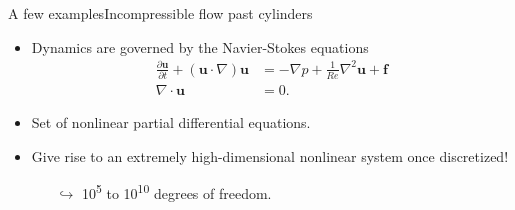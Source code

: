 \documentclass[usenames,dvipsnames,svgnames,10pt,aspectratio=169]{beamer}
\begin{document}
\begin{frame}[t, c]{A few examples}{Incompressible flow past cylinders}
	\begin{minipage}{.48\textwidth}
		\begin{itemize}
			\item Dynamics are governed by the Navier-Stokes equations
			\[
				\begin{aligned}
					\displaystyle \frac{\partial {\bm u}}{\partial t} + ({\bm u} \cdot \nabla ) {\bm u} & = - \nabla p + \frac{1}{Re}\nabla^2 {\bm u} + {\bm f}\\
					\nabla \cdot {\bm u} & = 0.
				\end{aligned}
			\]

			\medskip

			\item Set of nonlinear partial differential equations.

			\bigskip

			\item Give rise to an extremely high-dimensional nonlinear system once discretized!
			\begin{itemize}
				\item[\( \hookrightarrow \)] 10\textsuperscript{5} to 10\textsuperscript{10} degrees of freedom.
			\end{itemize}
		\end{itemize}
	\end{minipage}%
	\hfill
	\begin{minipage}{.48\textwidth}
		\begin{center}
		\end{center}
	\end{minipage}

	\vspace{1cm}
\end{frame}
\end{document}
